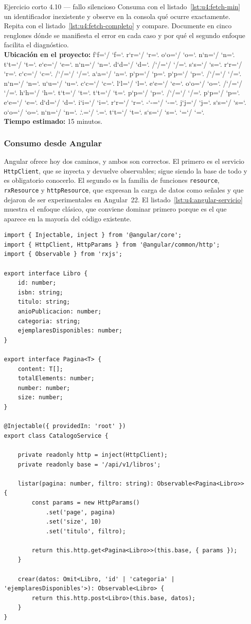 \documentclass[11pt,a4paper,openany]{book}
\newcommand{\ruta}[1]{{\ttfamily\small\rutaaux #1\relax}}
\def\rutaaux{\futurelet\next\rutapaso}
\def\rutapaso{%
	\ifx\next\relax \let\sig\relax
	\else \let\sig\rutaimprime \fi \sig}
\def\rutaimprime#1{%
	#1\ifnum`#1=`/ \allowbreak\fi
	\ifnum`#1=`. \allowbreak\fi
	\rutaaux}
\begin{document}
\begin{cajaejercicio}{Ejercicio corto 4.10 --- fallo silencioso}
	Consuma con el listado~\ref{lst:u4:fetch-min} un identificador inexistente y observe en la consola qué ocurre exactamente. Repita con el listado~\ref{lst:u4:fetch-completo} y compare. Documente en cinco renglones dónde se manifiesta el error en cada caso y por qué el segundo enfoque facilita el diagnóstico.\\[3pt]
	\textbf{Ubicación en el proyecto:} \ruta{frontend/src/app/nucleo/http/pedir-json.ts}\\[3pt]
	\textbf{Tiempo estimado:} 15 minutos.
\end{cajaejercicio}

\subsubsection{Consumo desde Angular}

Angular ofrece hoy dos caminos, y ambos son correctos. El primero es el servicio \texttt{HttpClient}, que se inyecta y devuelve observables; sigue siendo la base de todo y es obligatorio conocerlo. El segundo es la familia de funciones \texttt{resource}, \texttt{rxResource} y \texttt{httpResource}, que expresan la carga de datos como señales y que dejaron de ser experimentales en Angular~22. El listado~\ref{lst:u4:angular-servicio} muestra el enfoque clásico, que conviene dominar primero porque es el que aparece en la mayoría del código existente.

\begin{lstlisting}[style=ts,caption={Servicio Angular de acceso al catalogo con tipado explicito.},label={lst:u4:angular-servicio}]
import { Injectable, inject } from '@angular/core';
import { HttpClient, HttpParams } from '@angular/common/http';
import { Observable } from 'rxjs';

export interface Libro {
	id: number;
	isbn: string;
	titulo: string;
	anioPublicacion: number;
	categoria: string;
	ejemplaresDisponibles: number;
}

export interface Pagina<T> {
	content: T[];
	totalElements: number;
	number: number;
	size: number;
}

@Injectable({ providedIn: 'root' })
export class CatalogoService {

	private readonly http = inject(HttpClient);
	private readonly base = '/api/v1/libros';

	listar(pagina: number, filtro: string): Observable<Pagina<Libro>> {
		const params = new HttpParams()
			.set('page', pagina)
			.set('size', 10)
			.set('titulo', filtro);

		return this.http.get<Pagina<Libro>>(this.base, { params });
	}

	crear(datos: Omit<Libro, 'id' | 'categoria' | 'ejemplaresDisponibles'>): Observable<Libro> {
		return this.http.post<Libro>(this.base, datos);
	}
}
\end{lstlisting}
\end{document}
